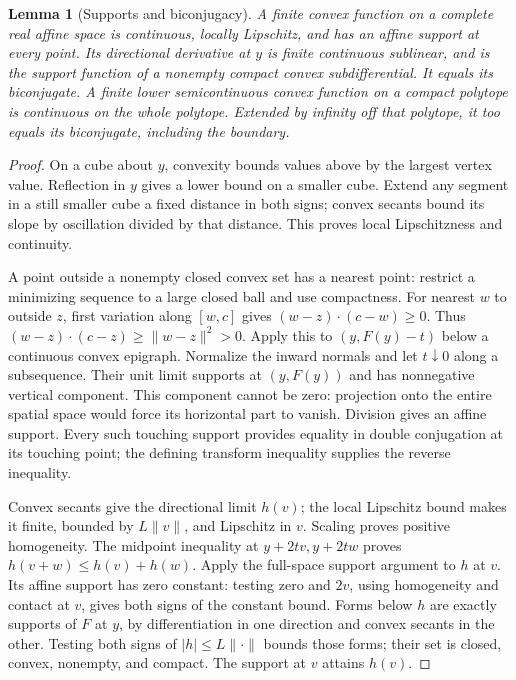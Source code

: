 \documentclass[11pt]{article}
\newtheorem{lemma}[theorem]{Lemma}
\begin{document}
\begin{lemma}[Supports and biconjugacy]\label{lem:support}
A finite convex function on a complete real affine space is continuous, locally Lipschitz, and has an affine support at every point. Its directional derivative at $y$ is finite continuous sublinear, and is the support function of a nonempty compact convex subdifferential. It equals its biconjugate. A finite lower semicontinuous convex function on a compact polytope is continuous on the whole polytope. Extended by infinity off that polytope, it too equals its biconjugate, including the boundary.
\end{lemma}
\begin{proof}
On a cube about $y$, convexity bounds values above by the largest vertex value. Reflection in $y$ gives a lower bound on a smaller cube. Extend any segment in a still smaller cube a fixed distance in both signs; convex secants bound its slope by oscillation divided by that distance. This proves local Lipschitzness and continuity.

A point outside a nonempty closed convex set has a nearest point: restrict a minimizing sequence to a large closed ball and use compactness. For nearest $w$ to outside $z$, first variation along $[w,c]$ gives $(w-z)\cdot(c-w)\geq0$. Thus $(w-z)\cdot(c-z)\geq\|w-z\|^2>0$. Apply this to $(y,F(y)-t)$ below a continuous convex epigraph. Normalize the inward normals and let $t\downarrow0$ along a subsequence. Their unit limit supports at $(y,F(y))$ and has nonnegative vertical component. This component cannot be zero: projection onto the entire spatial space would force its horizontal part to vanish. Division gives an affine support. Every such touching support provides equality in double conjugation at its touching point; the defining transform inequality supplies the reverse inequality.

Convex secants give the directional limit $h(v)$; the local Lipschitz bound makes it finite, bounded by $L\|v\|$, and Lipschitz in $v$. Scaling proves positive homogeneity. The midpoint inequality at $y+2tv,y+2tw$ proves $h(v+w)\leq h(v)+h(w)$. Apply the full-space support argument to $h$ at $v$. Its affine support has zero constant: testing zero and $2v$, using homogeneity and contact at $v$, gives both signs of the constant bound. Forms below $h$ are exactly supports of $F$ at $y$, by differentiation in one direction and convex secants in the other. Testing both signs of $|h|\leq L\|\cdot\|$ bounds those forms; their set is closed, convex, nonempty, and compact. The support at $v$ attains $h(v)$.


\end{proof}
\end{document}

